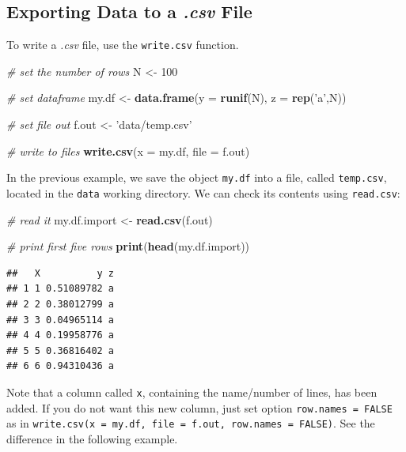 \documentclass[11pt,]{book}
\newenvironment{Shaded}{\begin{snugshade}}{\end{snugshade}}
\newcommand{\KeywordTok}[1]{\textcolor[rgb]{0.27,0.27,0.27}{\textbf{#1}}}
\newcommand{\DataTypeTok}[1]{\textcolor[rgb]{0.27,0.27,0.27}{#1}}
\newcommand{\DecValTok}[1]{\textcolor[rgb]{0.06,0.06,0.06}{#1}}
\newcommand{\StringTok}[1]{\textcolor[rgb]{0.5,0.5,0.5}{#1}}
\newcommand{\CommentTok}[1]{\textcolor[rgb]{0.56,0.35,0.01}{\textit{#1}}}
\newcommand{\NormalTok}[1]{#1}
\begin{document}
\subsection{\texorpdfstring{Exporting Data to a \emph{.csv}
File}{Exporting Data to a .csv File}}\label{exporting-data-to-a-.csv-file}

To write a \emph{.csv} file, use the \texttt{write.csv} function.
 

\begin{Shaded}
\begin{Highlighting}[]
\CommentTok{# set the number of rows}
\NormalTok{N <-}\StringTok{ }\DecValTok{100}

\CommentTok{# set dataframe}
\NormalTok{my.df <-}\StringTok{ }\KeywordTok{data.frame}\NormalTok{(}\DataTypeTok{y =} \KeywordTok{runif}\NormalTok{(N), }\DataTypeTok{z =} \KeywordTok{rep}\NormalTok{(}\StringTok{'a'}\NormalTok{,N))}

\CommentTok{# set file out}
\NormalTok{f.out <-}\StringTok{ 'data/temp.csv'}

\CommentTok{# write to files}
\KeywordTok{write.csv}\NormalTok{(}\DataTypeTok{x =}\NormalTok{ my.df, }\DataTypeTok{file =}\NormalTok{ f.out)}
\end{Highlighting}
\end{Shaded}

In the previous example, we save the object \texttt{my.df} into a file,
called \texttt{temp.csv}, located in the \texttt{data} working
directory. We can check its contents using \texttt{read.csv}:

\begin{Shaded}
\begin{Highlighting}[]
\CommentTok{# read it}
\NormalTok{my.df.import <-}\StringTok{ }\KeywordTok{read.csv}\NormalTok{(f.out)}

\CommentTok{# print first five rows}
\KeywordTok{print}\NormalTok{(}\KeywordTok{head}\NormalTok{(my.df.import))}
\end{Highlighting}
\end{Shaded}

\begin{verbatim}
##   X          y z
## 1 1 0.51089782 a
## 2 2 0.38012799 a
## 3 3 0.04965114 a
## 4 4 0.19958776 a
## 5 5 0.36816402 a
## 6 6 0.94310436 a
\end{verbatim}

Note that a column called \texttt{x}, containing the name/number of
lines, has been added. If you do not want this new column, just set
option \texttt{row.names\ =\ FALSE} as in
\texttt{write.csv(x\ =\ my.df,\ file\ =\ f.out,\ row.names\ =\ FALSE)}.
See the difference in the following example.
\end{document}
